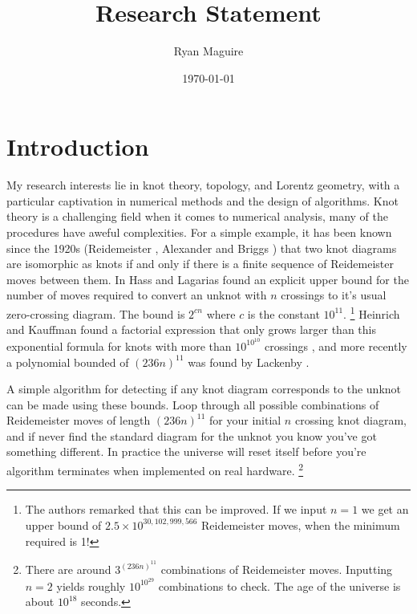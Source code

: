 \documentclass{article}
\title{Research Statement}
\author{Ryan Maguire}
\date{\today}
\theoremstyle{plain}
\begin{document}
    \maketitle
    \section{Introduction}
        My research interests lie in knot theory, topology, and Lorentz
        geometry, with a particular captivation in numerical methods and the
        design of algorithms. Knot theory is a challenging field when it comes
        to numerical analysis, many of the procedures have aweful complexities.
        For a simple example, it has been known since the 1920s
        (Reidemeister \cite{Reidemeister1927}, Alexander and Briggs
        \cite{AlexanderBriggs1926}) that two knot diagrams are isomorphic as
        knots if and only if there is a finite sequence of Reidemeister moves
        between them. In \cite{HassLagarias2001} Hass and Lagarias found an
        explicit upper bound for the number of moves required to convert an
        unknot with $n$ crossings to it's usual zero-crossing diagram. The
        bound is $2^{cn}$ where $c$ is the constant $10^{11}$.%
        \footnote{%
            The authors remarked that this can be improved.
            If we input $n=1$ we get an upper bound of
            $2.5\times{10}^{30,102,999,566}$ Reidemeister moves,
            when the minimum required is 1!
        }
        Heinrich and Kauffman found a factorial expression that only grows
        larger than this exponential formula for knots with more than
        $10^{10^{10}}$ crossings \cite{HenrichKauffman2010Unknotting}, and
        more recently a polynomial bounded of
        $(236n)^{11}$ was found by Lackenby \cite{Lackenby2015Unknotting}.
        \par\hfill\par
        A simple algorithm for detecting if any knot diagram corresponds to the
        unknot can be made using these bounds. Loop through all possible
        combinations of Reidemeister moves of length $(236n)^{11}$ for your
        initial $n$ crossing knot diagram, and if never
        find the standard diagram for the unknot you know you've got something
        different. In practice the universe will reset itself before you're
        algorithm terminates when implemented on real hardware.%
        \footnote{%
            There are around $3^{(236n)^{11}}$ combinations of Reidemeister
            moves. Inputting $n=2$ yields roughly $10^{10^{29}}$ combinations
            to check. The age of the universe is about $10^{18}$ seconds.
        }
\end{document}
